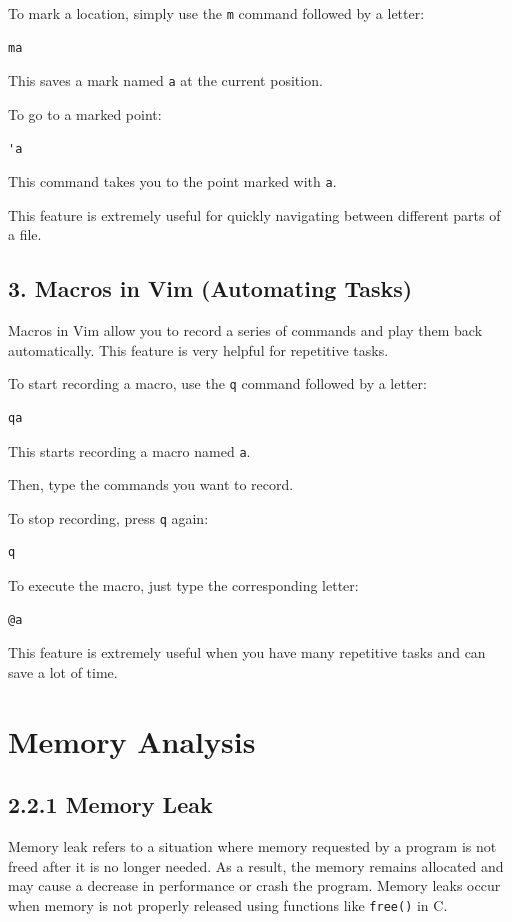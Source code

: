 \documentclass{article}
\begin{document}
To mark a location, simply use the \texttt{m} command followed by a letter:
\begin{verbatim}
ma
\end{verbatim}
This saves a mark named \texttt{a} at the current position.

To go to a marked point:
\begin{verbatim}
'a
\end{verbatim}
This command takes you to the point marked with \texttt{a}.

This feature is extremely useful for quickly navigating between different parts of a file.

\subsection*{3. Macros in Vim (Automating Tasks)}
Macros in Vim allow you to record a series of commands and play them back automatically. This feature is very helpful for repetitive tasks.

To start recording a macro, use the \texttt{q} command followed by a letter:
\begin{verbatim}
qa
\end{verbatim}
This starts recording a macro named \texttt{a}.

Then, type the commands you want to record.

To stop recording, press \texttt{q} again:
\begin{verbatim}
q
\end{verbatim}

To execute the macro, just type the corresponding letter:
\begin{verbatim}
@a
\end{verbatim}

This feature is extremely useful when you have many repetitive tasks and can save a lot of time.










\section*{Memory Analysis}

\subsection*{2.2.1 Memory Leak}
Memory leak refers to a situation where memory requested by a program is not freed after it is no longer needed. As a result, the memory remains allocated and may cause a decrease in performance or crash the program. Memory leaks occur when memory is not properly released using functions like \texttt{free()} in C.
\end{document}
